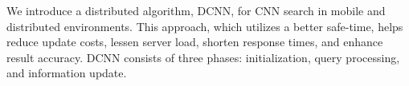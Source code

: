 We introduce a distributed algorithm, DCNN, for CNN search in mobile and distributed environments. This approach, which utilizes a better safe-time, helps reduce update costs, lessen server load, shorten response times, and enhance result accuracy. DCNN consists of three phases: initialization, query processing, and information update.
